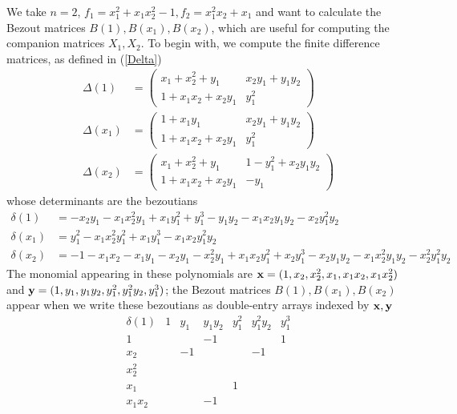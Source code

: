 \documentclass{standalone}
\begin{document}
\begin{exmp}
\label{bez_multi}
We take $n = 2$, $f_1 = x_1^2 + x_1x_2^2 - 1, f_2 = x_1^2x_2 + x_1$ and want to calculate the Bezout matrices $B(1), B(x_1), B(x_2)$, which are useful for computing the companion matrices $X_1, X_2$. To begin with, we compute the finite difference matrices, as defined in (\ref{Delta})
\begin{align}
\Delta(1) &=
\begin{pmatrix}
x_1 + x_2^2 + y_1 & x_2y_1 + y_1y_2 \\
1 + x_1x_2 + x_2y_1 & y_1^2
\end{pmatrix} \nonumber  \\
\Delta(x_1) &=
\begin{pmatrix}
1 + x_1y_1 & x_2y_1 + y_1y_2 \\
1 + x_1x_2 + x_2y_1 & y_1^2
\end{pmatrix} \nonumber  \\
\Delta(x_2) &=
\begin{pmatrix}
x_1 + x_2^2 + y_1 & 1 - y_1^2 + x_2y_1y_2 \\
1 + x_1x_2 + x_2y_1  & -y_1
\end{pmatrix} \nonumber
\end{align}
whose determinants are the bezoutians
\begin{align}
\delta(1) &= -x_2y_1 - x_1x_2^2y_1 + x_1y_1^2 + y_1^3 - y_1y_2 - x_1x_2y_1y_2 - x_2y_1^2y_2 \nonumber \\
\delta(x_1) &=  y_1^2 - x_1x_2^2y_1^2 + x_1y_1^3 - x_1x_2y_1^2y_2 \nonumber \\
\delta(x_2) &= -1 - x_1x_2 - x_1y_1 -x_2y_1 - x_2^2y_1 + x_1x_2y_1^2 + x_2y_1^3 - x_2y_1y_2 - x_1x_2^2y_1y_2 - x_2^2y_1^2y_2\nonumber
\end{align}
The monomial appearing in these polynomials are
$\bold{x} = (1, x_2, x_2^2, x_1, x_1x_2, x_1x_2^2)$ and $\bold{y} = (1, y_1, y_1y_2, y_1^2, y_1^2y_2, y_1^3)$; the Bezout matrices $B(1), B(x_1), B(x_2)$ appear when we write these bezoutians as double-entry arrays indexed by $\bold{x}, \bold{y}$
$$\begin{array}{c|cccccc}
	\delta(1) & 1 & y_1 & y_1y_2 & y_1^2 & y_1^2y_2 & y_1^3 \\
	\hline
	1 &  &  & -1 &  &  & 1\\
	x_2 &  & -1 &  &  & -1 & \\
	x_2^2 &  &  &  &  &  & \\
	x_1 &  &  &  & 1 &  & \\
	x_1x_2 &  &  & -1 &  &  & \\

\end{array}$$
\end{exmp}
\end{document}
